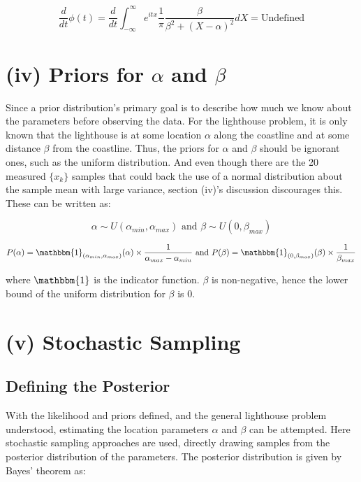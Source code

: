 \documentclass[12pt]{report} %
\begin{document}
\begin{equation}
    \frac{d}{dt}\phi(t) = \frac{d}{dt}\int_{-\infty}^{\infty} e^{itx} \frac{1}{\pi} \frac{\beta}{\beta^{2} + (X - \alpha)^{2}} dX = \text{Undefined}
\end{equation}


\chapter{(iv) Priors for $\alpha$ and $\beta$}

Since a prior distribution's primary goal is to describe how much we know about the parameters before observing the data\cite[p.154]{FJames2006}. For the lighthouse problem, it is only known that the lighthouse is at some location $\alpha$ along the coastline and at some distance $\beta$ from the coastline. Thus, the priors for $\alpha$ and $\beta$ should be ignorant ones, such as the uniform distribution. And even though there are the 20 measured $\{x_{k}\}$ samples that could back the use of a normal distribution about the sample mean with large variance, section (iv)'s discussion discourages this. These can be written as\cite[p.79]{FJames2006}:

\begin{equation}
    \alpha \sim U(\alpha_{min}, \alpha_{max}) \text{ and } \beta \sim U(0, \beta_{max})
\end{equation}

\begin{equation}
    P(\alpha) = \mathbbm{1}_{(\alpha_{min}, \alpha_{max})}(\alpha) \times \frac{1}{\alpha_{max} - \alpha_{min}} \text{ and } P(\beta) = \mathbbm{1}_{(0, \beta_{max})}(\beta) \times \frac{1}{\beta_{max}}
\end{equation}

where $\mathbbm{1}$ is the indicator function. $\beta$ is non-negative, hence the lower bound of the uniform distribution for $\beta$ is 0.


\chapter{(v) Stochastic Sampling }

\section{Defining the Posterior}

With the likelihood and priors defined, and the general lighthouse problem understood, estimating the location parameters $\alpha$ and $\beta$ can be attempted. Here stochastic sampling approaches are used, directly drawing samples from the posterior distribution of the parameters. The posterior distribution is given by Bayes' theorem as:
\end{document}
